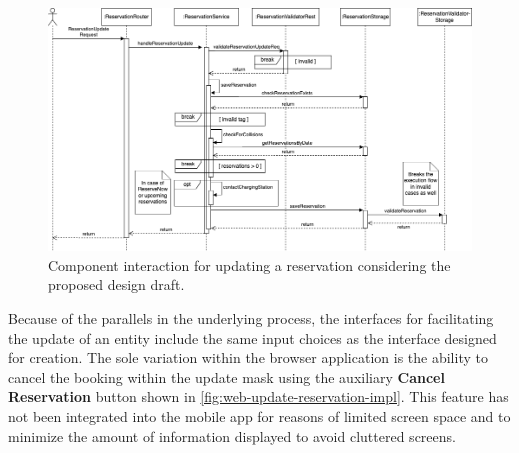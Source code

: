\newpage

\begin{figure}[h]
    \centering
    \includegraphics[scale=0.4]{resources/images/main/6_implementation/processes/ReservationUpdate.png}
    \caption{Component interaction for updating a reservation considering the proposed design draft.}
    \label{fig:update-reservation-seqflow}
\end{figure}

\noindent Because of the parallels in the underlying process, the interfaces for facilitating the update of an entity include the same input choices as the interface designed for creation.
The sole variation within the browser application is the ability to cancel the booking within the update mask using the auxiliary \textbf{Cancel Reservation} button shown in \ref{fig:web-update-reservation-impl}. 
This feature has not been integrated into the mobile app for reasons of limited screen space and to minimize the amount of information displayed to avoid cluttered screens.

